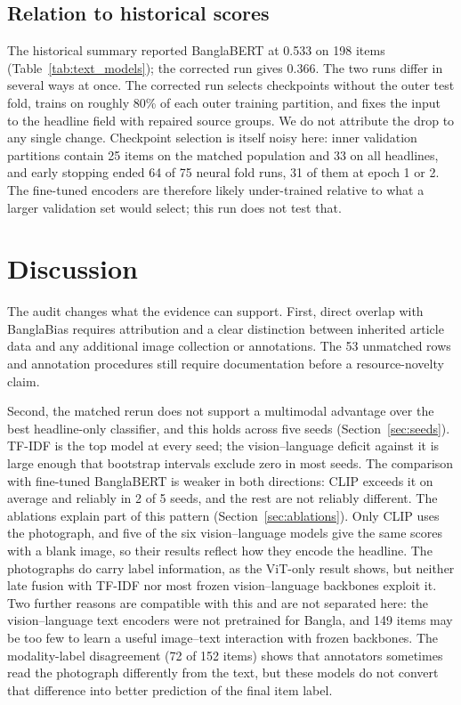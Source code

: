\documentclass[11pt]{article}
\begin{document}
\subsection{Relation to historical scores}
The historical summary reported BanglaBERT at 0.533 on 198 items (Table~\ref{tab:text_models}); the corrected run gives 0.366. %
The two runs differ in several ways at once. The corrected run selects checkpoints without the outer test fold, trains on roughly 80\% of each outer training partition, and fixes the input to the headline field with repaired source groups. We do not attribute the drop to any single change. Checkpoint selection is itself noisy here: inner validation partitions contain 25 items on the matched population and 33 on all headlines, and early stopping ended 64 of 75 neural fold runs, 31 of them at epoch 1 or 2. %
The fine-tuned encoders are therefore likely under-trained relative to what a larger validation set would select; this run does not test that.

\section{Discussion}
The audit changes what the evidence can support. First, direct overlap with BanglaBias requires attribution and a clear distinction between inherited article data and any additional image collection or annotations. The 53 unmatched rows and annotation procedures still require documentation before a resource-novelty claim.

Second, the matched rerun does not support a multimodal advantage over the best headline-only classifier, and this holds across five seeds (Section~\ref{sec:seeds}). TF-IDF is the top model at every seed; the vision--language deficit against it is large enough that bootstrap intervals exclude zero in most seeds. The comparison with fine-tuned BanglaBERT is weaker in both directions: CLIP exceeds it on average and reliably in 2 of 5 seeds, and the rest are not reliably different. The ablations explain part of this pattern (Section~\ref{sec:ablations}). Only CLIP uses the photograph, and five of the six vision--language models give the same scores with a blank image, so their results reflect how they encode the headline. The photographs do carry label information, as the ViT-only result shows, but neither late fusion with TF-IDF nor most frozen vision--language backbones exploit it. Two further reasons are compatible with this and are not separated here: the vision--language text encoders were not pretrained for Bangla, and 149 items may be too few to learn a useful image--text interaction with frozen backbones. The modality-label disagreement (72 of 152 items) shows that annotators sometimes read the photograph differently from the text, but these models do not convert that difference into better prediction of the final item label.
\end{document}
